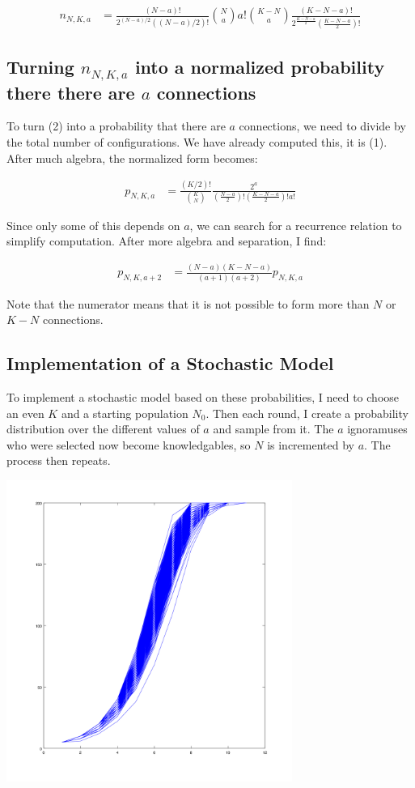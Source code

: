 \documentclass{article}
\begin{document}
\begin{align}
n_{N,K,a} & = \frac{(N-a)!}{2^{(N-a)/2} ((N-a)/2)!}
	{N \choose a}
	a !
	{K - N \choose a}
	\frac{(K - N - a)!}{2^{\frac{K - N - a}{2}} 
		(\frac{K-N-a}{2})!}
\end{align}

\subsection{Turning $n_{N,K,a}$ into a normalized probability
	there there are $a$ connections}

To turn (2) into a probability that there are $a$ connections,
	we need to divide by the total number of configurations.
We have already computed this, it is (1).
After much algebra, the normalized form becomes:

\begin{align}
p_{N,K,a} & = \frac{(K/2)!}{{K \choose N}}
	\frac{2^a}{ \left(\frac{N - a}{2}\right)!
		\left(\frac{K - N - a}{2}\right)!
		a! }
\end{align}

Since only some of this depends on $a$, we can search for
	a recurrence relation to simplify computation.
After more algebra and separation, I find:

\begin{align}
p_{N,K,a+2} & = \frac{(N - a)(K - N - a)}{(a + 1)(a + 2)} 
	p_{N,K,a}
\end{align}

Note that the numerator means that it is not possible to form
	more than $N$ or $K-N$ connections.

\subsection{Implementation of a Stochastic Model}

To implement a stochastic model based on these probabilities,
	I need to choose an even $K$ and a starting population
	$N_0$.
Then each round, I create a probability distribution over the
	different values of $a$ and sample from it.
The $a$ ignoramuses who were selected now become knowledgables,
	so $N$ is incremented by $a$.
The process then repeats.

\includegraphics[width=0.7\textwidth]{lines.png}
\end{document}
